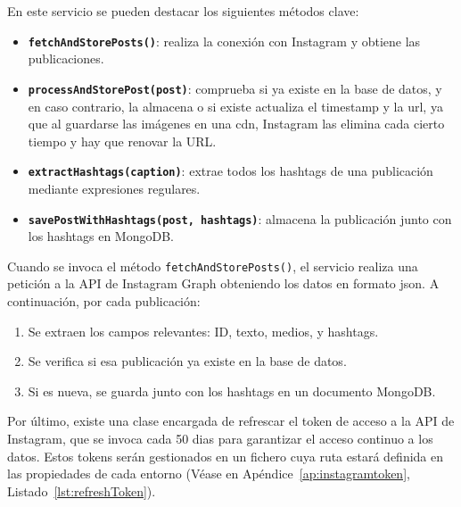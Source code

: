 
En este servicio se pueden destacar los siguientes métodos clave:

\begin{itemize}
    \item \textbf{\texttt{fetchAndStorePosts()}}: realiza la conexión con Instagram y obtiene las publicaciones.
    \item \textbf{\texttt{processAndStorePost(post)}}: comprueba si ya existe en la base de datos, y en caso contrario, la almacena o si existe actualiza el timestamp y la url, ya que al guardarse las imágenes en una \gls{cdn}, Instagram las elimina cada cierto tiempo y hay que renovar la URL.
    \item \textbf{\texttt{extractHashtags(caption)}}: extrae todos los hashtags de una publicación mediante expresiones regulares.
    \item \textbf{\texttt{savePostWithHashtags(post, hashtags)}}: almacena la publicación junto con los hashtags en MongoDB.
\end{itemize}

Cuando se invoca el método \texttt{fetchAndStorePosts()}, el servicio realiza una petición a la API de Instagram Graph \cite{api:instagram} obteniendo los datos en formato \gls{json}. A continuación, por cada publicación:

\begin{enumerate}
    \item Se extraen los campos relevantes: ID, texto, medios, y hashtags.
    \item Se verifica si esa publicación ya existe en la base de datos.
    \item Si es nueva, se guarda junto con los hashtags en un documento MongoDB.
\end{enumerate}

Por último, existe una clase encargada de refrescar el token de acceso a la API de Instagram, que se invoca cada 50 dias para garantizar el acceso continuo a los datos. Estos tokens serán gestionados en un fichero cuya ruta estará definida en las propiedades de cada entorno (Véase en Apéndice~\ref{ap:instagramtoken}, Listado~\ref{lst:refreshToken}).


